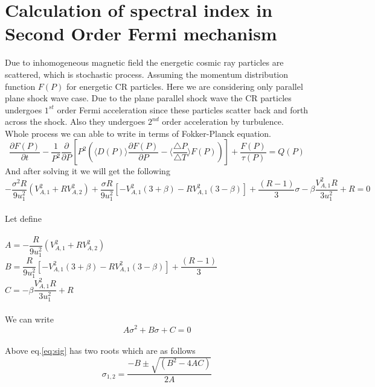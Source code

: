 \documentclass[10pt]{article}
\begin{document}
\section[]{Calculation of spectral index in Second Order Fermi mechanism}


Due to inhomogeneous magnetic field the energetic cosmic ray particles are scattered, which is stochastic process. Assuming the momentum distribution function $F\left(P\right)$ for energetic CR particles. Here we are considering only parallel plane shock wave case. Due to the plane parallel shock wave the CR particles undergoes $1^{st}$ order Fermi acceleration since these particles scatter back and forth across the shock. Also they undergoes $2^{nd}$ order  acceleration by turbulence. Whole process we can able to write in terms of Fokker-Planck equation.
\begin{dmath}
\frac{\partial F\left(P\right)}{\partial t}-\frac{1}{P^{2}}\frac{\partial}{\partial P}\left[P^{2}\left(\langle D\left(P\right)\rangle\frac{\partial F\left(P\right)}{\partial P}-\langle\frac{\triangle P}{\triangle T}\rangle F\left(P\right)\right)\right]+
\frac{F\left(P\right)}{\tau\left(P\right)}=Q\left(P\right)
\label{eq:fokker-planck}
\end{dmath} 
\newline And after solving it we will get the following\\
   \begin{math}
-\dfrac{\sigma^{2}R}{9u_{1}^{2}}\left({V_{A,1}^2}+R{V_{A,2}^2}\right)+\dfrac{\sigma R}{9u_{1}^{2}}\left[{-V_{A,1}^2}\left(3+\beta\right)-R{V_{A,1}^2}\left(3-\beta\right)\right]+\dfrac{\left(R-1\right)}{3}\sigma-\beta\dfrac{V_{A,1}^{2}R}{3u_{1}^{2}}+R=0
\label{eq:sta12}
\end{math}\\
\\Let define\\\\
$A=-\dfrac{R}{9u_{1}^{2}}\left({V_{A,1}^2}+R{V_{A,2}^2}\right)$\\
$B=\dfrac{R}{9u_{1}^{2}}\left[{-V_{A,1}^2}\left(3+\beta\right)-R{V_{A,1}^2}\left(3-\beta\right)\right]+\dfrac{\left(R-1\right)}{3}$\\
$C=-\beta\dfrac{V_{A,1}^{2}R}{3u_{1}^{2}}+R$\\ \\
 We can write
 \begin{equation}
 A\sigma^{2}+B\sigma+C=0
 \label{eq:sig}
 \end{equation}\\
 Above eq.\ref{eq:sig} has two roots which are as follows\\
 \begin{equation}
 \sigma_{1,2}=\dfrac{-B\pm \sqrt{ \left(B^{2}-4AC\right)}}{2A}
 \label{roots}
 \end{equation}
\end{document}
